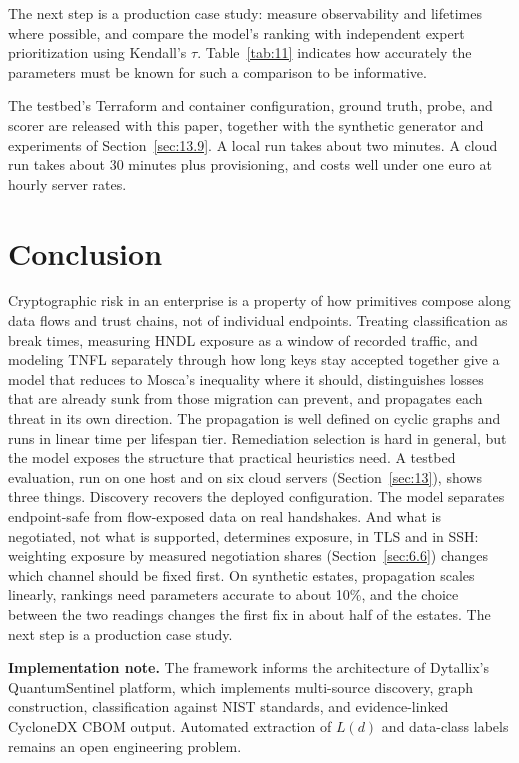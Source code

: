 \documentclass[conference]{IEEEtran}
\begin{document}
The next step is a production case study: measure observability and lifetimes where possible, and compare the model's ranking with independent expert prioritization using Kendall's $\tau$. Table~\ref{tab:11} indicates how accurately the parameters must be known for such a comparison to be informative.

The testbed's Terraform and container configuration, ground truth, probe, and scorer are released with this paper, together with the synthetic generator and experiments of Section~\ref{sec:13.9}. A local run takes about two minutes. A cloud run takes about 30 minutes plus provisioning, and costs well under one euro at hourly server rates.

\section{Conclusion}\label{sec:14}

Cryptographic risk in an enterprise is a property of how primitives compose along data flows and trust chains, not of individual endpoints. Treating classification as break times, measuring HNDL exposure as a window of recorded traffic, and modeling TNFL separately through how long keys stay accepted together give a model that reduces to Mosca's inequality where it should, distinguishes losses that are already sunk from those migration can prevent, and propagates each threat in its own direction. The propagation is well defined on cyclic graphs and runs in linear time per lifespan tier. Remediation selection is hard in general, but the model exposes the structure that practical heuristics need. A testbed evaluation, run on one host and on six cloud servers (Section~\ref{sec:13}), shows three things. Discovery recovers the deployed configuration. The model separates endpoint-safe from flow-exposed data on real handshakes. And what is negotiated, not what is supported, determines exposure, in TLS and in SSH: weighting exposure by measured negotiation shares (Section~\ref{sec:6.6}) changes which channel should be fixed first. On synthetic estates, propagation scales linearly, rankings need parameters accurate to about 10\%, and the choice between the two readings changes the first fix in about half of the estates. The next step is a production case study.

\textbf{Implementation note.} The framework informs the architecture of Dytallix's QuantumSentinel platform, which implements multi-source discovery, graph construction, classification against NIST standards, and evidence-linked CycloneDX CBOM output. Automated extraction of $L(d)$ and data-class labels remains an open engineering problem.
\end{document}
